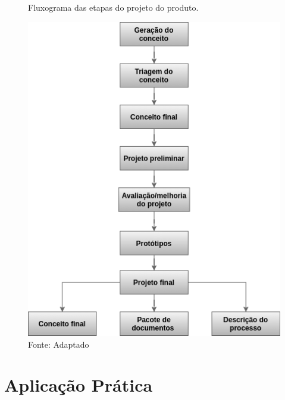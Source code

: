 \begin{figure}[H]
  \centering
  \caption{Fluxograma das etapas do projeto do produto.}
  \includegraphics[width=1\textwidth]{images/projeto_produto.png}
  \caption*{Fonte: Adaptado \cite{slack2006administracao} }
  \label{fig:projeto_produto}
\end{figure}



\section{Aplicação Prática} 
\label{sec:projeto_do_produto_aplicacao}